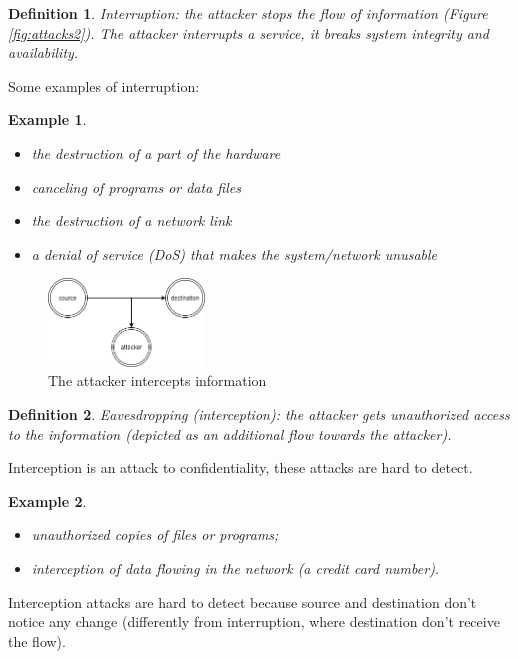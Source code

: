 \documentclass[a4paper, 12pt]{report}
\newtheorem{definition}{\textbf{Definition}}
\newtheorem{example}{\textbf{Example}}
\begin{document}
\begin{definition}
	Interruption: the attacker stops the flow of information (Figure \ref{fig:attacks2}). The attacker interrupts a service, it breaks system integrity and availability.
\end{definition}

\vspace{5mm}
Some examples of interruption:
\begin{example}
	\leavevmode
	\begin{itemize}
		\item the destruction of a part of the hardware
		\item canceling of programs or data files
		\item the destruction of a network link
		\item a denial of service (DoS) that makes the system/network unusable 
	\end{itemize}
\end{example}

\begin{figure}
	\includegraphics[width=0.37\textwidth]{images/attacks3.png}
	\caption{The attacker intercepts information}
	\label{fig:attacks3}
\end{figure}

\begin{definition}
	Eavesdropping (interception): the attacker gets unauthorized access to the information (depicted as an additional flow towards the attacker).
\end{definition}

\vspace{5mm}
Interception is an attack to confidentiality, these attacks are hard to detect.
\begin{example}
	\leavevmode
	\begin{itemize}
		\item unauthorized copies of files or programs;
		\item interception of data flowing in the network (a credit card number).
	\end{itemize}
\end{example}
\vspace{15mm}
Interception attacks are hard to detect because source and destination don't notice any change (differently from interruption, where destination don't receive the flow).
\end{document}
